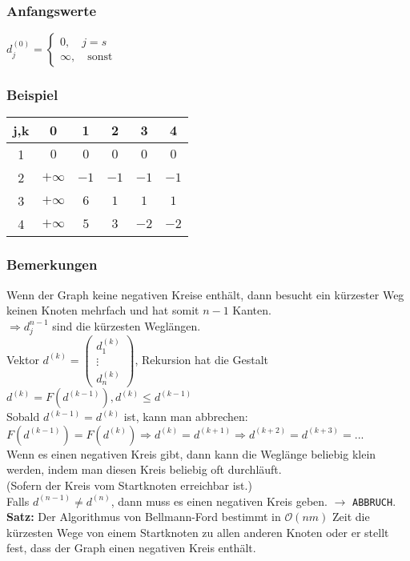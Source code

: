 \subsubsection{Anfangswerte}
$d_j^{(0)} = \begin{cases} 0,\quad j=s \\ \infty, \quad \text{sonst}\end{cases}$\\
\subsubsection{Beispiel}
\begin{tabular}{c|ccccc}
j,k & 0 & 1 & 2 & 3 & 4\\
\hline
1 & $0$ &$0$&$0$&$0$&$0$\\
2 & $+\infty$&$-1$&$-1$&$-1$&$-1$\\
3 & $+\infty$&$6$&$1$&$1$&$1$\\
4 & $+\infty$&$5$&$3$&$-2$&$-2$\\
\end{tabular}
\subsubsection{Bemerkungen}
Wenn der Graph keine negativen Kreise enthält, dann besucht ein kürzester Weg keinen Knoten mehrfach und hat somit $n-1$ Kanten.\\
$\Rightarrow d_j^{n-1}$ sind die kürzesten Weglängen.\\
Vektor $d^{(k)} = \begin{pmatrix} d_1^{(k)} \\ \vdots \\d_n^{(k)} \end{pmatrix}$, Rekursion hat die Gestalt $d^{(k)} = F(d^{(k-1)}), d^{(k)} \leq d^{(k-1)}$\\
Sobald $d^{(k-1)} = d^{(k)}$ ist, kann man abbrechen:\\
 $F(d^{(k-1)}) = F(d^{(k)}) \Rightarrow d^{(k)} = d^{(k+1)} \Rightarrow d^{(k+2)} = d^{(k+3)} = ...$\\
 Wenn es einen negativen Kreis gibt, dann kann die Weglänge beliebig klein werden, indem man diesen Kreis beliebig oft durchläuft.\\
 (Sofern der Kreis vom Startknoten erreichbar ist.)\\
 Falls $d^{(n-1)} \neq d^{(n)}$, dann muss es einen negativen Kreis geben. $\rightarrow$ \lstinline!ABBRUCH!.\\
 \textbf{Satz:} Der Algorithmus von Bellmann-Ford bestimmt in $\mathcal{O}(nm)$ Zeit die kürzesten Wege von einem Startknoten zu allen anderen Knoten oder er stellt fest, dass der Graph einen negativen Kreis enthält.\\
